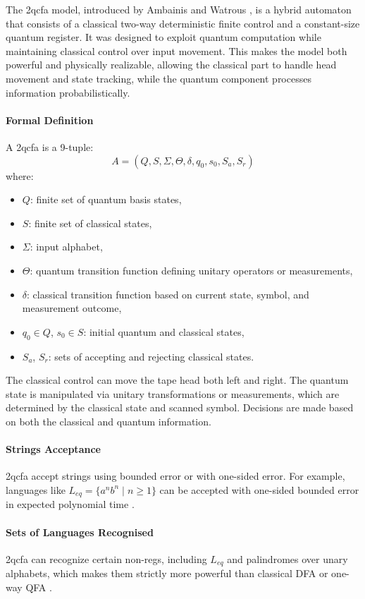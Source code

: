   
The \gls{2qcfa} model, introduced by Ambainis and Watrous \cite{ambainis2002two}, is a hybrid automaton that consists of a classical two-way deterministic finite control and a constant-size quantum register. It was designed to exploit quantum computation while maintaining classical control over input movement. This makes the model both powerful and physically realizable, allowing the classical part to handle head movement and state tracking, while the quantum component processes information probabilistically.

\paragraph{Formal Definition}  
A \gls{2qcfa} is a 9-tuple:
\[
A = (Q, S, \Sigma, \Theta, \delta, q_0, s_0, S_a, S_r)
\]
where:
\begin{itemize}
    \item $Q$: finite set of quantum basis states,
    \item $S$: finite set of classical states,
    \item $\Sigma$: input alphabet,
    \item $\Theta$: quantum transition function defining unitary operators or measurements,
    \item $\delta$: classical transition function based on current state, symbol, and measurement outcome,
    \item $q_0 \in Q$, $s_0 \in S$: initial quantum and classical states,
    \item $S_a$, $S_r$: sets of accepting and rejecting classical states.
\end{itemize}
The classical control can move the tape head both left and right. The quantum state is manipulated via unitary transformations or measurements, which are determined by the classical state and scanned symbol. Decisions are made based on both the classical and quantum information.

\paragraph{Strings Acceptance}  
\gls{2qcfa} accept strings using bounded error or with one-sided error. For example, languages like $L_{eq} = \{ a^n b^n \mid n \geq 1 \}$ can be accepted with one-sided bounded error in expected polynomial time \cite{ambainis2002two}.

\paragraph{Sets of Languages Recognised}  
\gls{2qcfa} can recognize certain non-\glspl{reg}, including $L_{eq}$ and palindromes over unary alphabets, which makes them strictly more powerful than classical DFA or one-way QFA \cite{ambainis2002two, li2015hybrid}.

